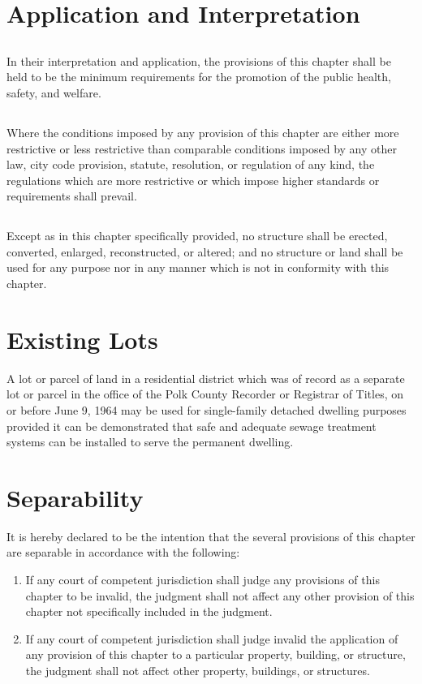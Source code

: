 \section{Application and Interpretation}
\subsection{}
In their interpretation and application, the provisions of this chapter shall be held to be the minimum requirements for the promotion of the public health, safety, and welfare.
\subsection{}
Where the conditions imposed by any provision of this chapter are either more restrictive or less restrictive than comparable conditions imposed by any other law, city code provision, statute, resolution, or regulation of any kind, the regulations which are more restrictive or which impose higher standards or requirements shall prevail.
\subsection{}
Except as in this chapter specifically provided, no structure shall be erected, converted, enlarged, reconstructed, or altered; and no structure or land shall be used for any purpose nor in any manner which is not in conformity with this chapter.

\section{Existing Lots}
A lot or parcel of land in a residential district which was of record as a separate lot or parcel in the office of the Polk County Recorder or Registrar of Titles, on or before June 9, 1964 may be used for single-family detached dwelling purposes provided it can be demonstrated that safe and adequate sewage treatment systems can be installed to serve the permanent dwelling.

\section{Separability}
It is hereby declared to be the intention that the several provisions of this chapter are separable in accordance with the following:
\begin{enumerate}[{\indent}A)]
    \item If any court of competent jurisdiction shall judge any provisions of this chapter to be invalid, the judgment shall not affect any other provision of this chapter not specifically included in the judgment.
    \item If any court of competent jurisdiction shall judge invalid the application of any provision of this chapter to a particular property, building, or structure, the judgment shall not affect other property, buildings, or structures.
\end{enumerate}

